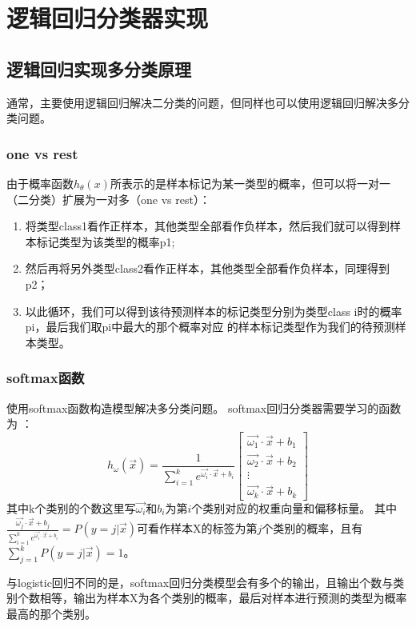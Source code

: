 \section{逻辑回归分类器实现}

\subsection{逻辑回归实现多分类原理}
通常，主要使用逻辑回归解决二分类的问题，但同样也可以使用逻辑回归解决多分类问题。
\subsubsection{one vs rest}
由于概率函数$h_{\theta}(x)$所表示的是样本标记为某一类型的概率，但可以将一对一（二分类）扩展为一对多（one vs rest）：
\begin{enumerate}
  \item 将类型class1看作正样本，其他类型全部看作负样本，然后我们就可以得到样本标记类型为该类型的概率p1;
  \item 然后再将另外类型class2看作正样本，其他类型全部看作负样本，同理得到p2；
  \item 以此循环，我们可以得到该待预测样本的标记类型分别为类型class i时的概率pi，最后我们取pi中最大的那个概率对应
  的样本标记类型作为我们的待预测样本类型。
\end{enumerate}

\subsubsection{softmax函数}
使用softmax函数构造模型解决多分类问题。
softmax回归分类器需要学习的函数为 ：
\begin{equation}
  h_\omega (\vec x)=\frac{1}{\sum_{i=1}^k e^{\vec{\omega_i}\cdot\vec{x}+b_i}}\begin{bmatrix}
    \vec{\omega_1}\cdot\vec x+b_1     \\
    \vec{\omega_2}\cdot\vec x+b_2 \\
    \vdots \\
    \vec{\omega_k}\cdot\vec x+b_k
  \end{bmatrix}
\end{equation}
其中k个类别的个数这里写$\vec{\omega_i}$和$b_i$为第$i$个类别对应的权重向量和偏移标量。
其中$\frac{\vec{\omega_j}\cdot\vec{x}+b_j}{\sum_{i=1}^k e^{\vec{\omega_i}\cdot\vec{x}+b_i}}=P(y=j|\vec{x})$可看作样本X的标签为第$j$个类别的概率，且有$\sum_{j=1}^{k}P(y=j|\vec{x})=1$。

与logistic回归不同的是，softmax回归分类模型会有多个的输出，且输出个数与类别个数相等，输出为样本X为各个类别的概率，最后对样本进行预测的类型为概率最高的那个类别。

